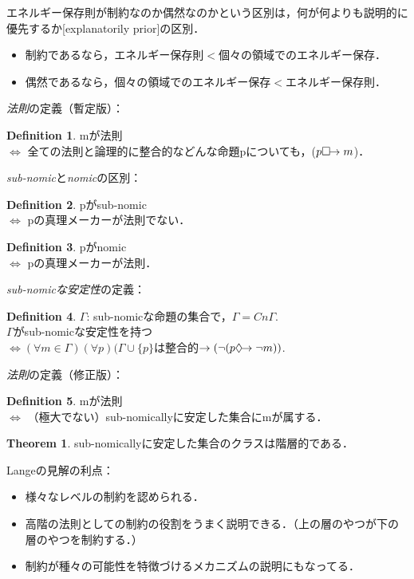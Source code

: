 \documentclass[twoside,11pt,uplatex]{jsarticle}
\theoremstyle{definition}
\newtheorem{dfn}{Definition}
\newtheorem{thm}{Theorem}
\begin{document}
エネルギー保存則が制約なのか偶然なのかという区別は，何が何よりも説明的に優先するか[explanatorily prior]の区別\citep[157]{Lange2012}．
\begin{itemize}
	\item 制約であるなら，エネルギー保存則$<$個々の領域でのエネルギー保存．
	\item 偶然であるなら，個々の領域でのエネルギー保存$<$エネルギー保存則．
\end{itemize}

\emph{法則}の定義（暫定版）\citep[171--2]{Lange2012}：
\begin{dfn}
mが法則\\
$\Longleftrightarrow$ 全ての法則と論理的に整合的などんな命題pについても，($p\Box\hspace{-4pt}\rightarrow m$)．
\end{dfn}


\emph{sub-nomic}と\emph{nomic}の区別\citep[171]{Lange2012}：
\begin{dfn}
pがsub-nomic\\
$\Longleftrightarrow$ pの真理メーカーが法則でない．
\end{dfn}
\begin{dfn}
pがnomic\\
$\Longleftrightarrow$ pの真理メーカーが法則．
\end{dfn}

\emph{sub-nomicな安定性}の定義\citep[172]{Lange2012}：
\begin{dfn}
$\Gamma$: sub-nomicな命題の集合で，$\Gamma=Cn\Gamma$.\\
$\Gamma$がsub-nomicな安定性を持つ\\
$\Longleftrightarrow(\forall m\in\Gamma)(\forall p)(\Gamma\cup\{p\}$は整合的$\rightarrow(\lnot(p\Diamond\hspace{-4pt}\rightarrow\lnot m))$.
\end{dfn}

\emph{法則}の定義（修正版）\citep[173]{Lange2012}：
\begin{dfn}
mが法則\\
$\Longleftrightarrow$ （極大でない）sub-nomicallyに安定した集合にmが属する．
\end{dfn}

\begin{thm}
sub-nomicallyに安定した集合のクラスは階層的である．\citep[173]{Lange2012}
\end{thm}

Langeの見解の利点\citep[174]{Lange2012}：
\begin{itemize}
	\item 様々なレベルの制約を認められる．
	\item 高階の法則としての制約の役割をうまく説明できる．（上の層のやつが下の層のやつを制約する．）
	\item 制約が種々の可能性を特徴づけるメカニズムの説明にもなってる．
\end{itemize}
\end{document}
